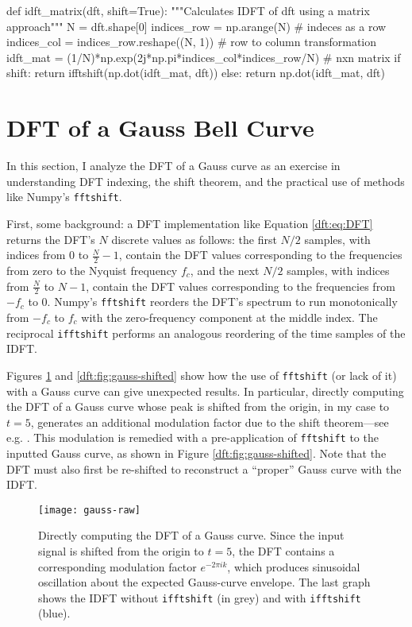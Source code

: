 \documentclass[11pt, a4paper]{article}
\begin{document}
\begin{python}
def idft_matrix(dft, shift=True):
    """Calculates IDFT of dft using a matrix approach"""
    N = dft.shape[0]
    indices_row = np.arange(N)  # indeces as a row
    indices_col = indices_row.reshape((N, 1))  # row to column transformation
    idft_mat = (1/N)*np.exp(2j*np.pi*indices_col*indices_row/N)  # nxn matrix
    if shift: return ifftshift(np.dot(idft_mat, dft))
    else: return np.dot(idft_mat, dft)
\end{python}


\section{DFT of a Gauss Bell Curve}
In this section, I analyze the DFT of a Gauss curve as an exercise in understanding DFT indexing, the shift theorem, and the practical use of methods like Numpy's \texttt{fftshift}.

First, some background: a DFT implementation like Equation \ref{dft:eq:DFT} returns the DFT's $ N $ discrete values as follows: the first $ N/2 $ samples, with indices from $ 0 $ to $ \frac{N}{2}-1 $, contain the DFT values corresponding to the frequencies from zero to the Nyquist frequency $ f_{c} $, and the next $ N/2 $ samples, with indices from $ \frac{N}{2} $ to $ N - 1 $, contain the DFT values corresponding to the frequencies from $ -f_{c} $ to $ 0 $. Numpy's \texttt{fftshift} reorders the DFT's spectrum to run monotonically from $ -f_{c} $ to $ f_{c} $ with the zero-frequency component at the middle index. The reciprocal \texttt{ifftshift} performs an analogous reordering of the time samples of the IDFT.


Figures \ref{dft:fig:gauss-raw} and \ref{dft:fig:gauss-shifted} show how the use of \texttt{fftshift} (or lack of it) with a Gauss curve can give unexpected results. In particular, directly computing the DFT of a Gauss curve whose peak is shifted from the origin, in my case to $ t = 5 $, generates an additional modulation factor due to the shift theorem---see e.g. \cite{wiki-shift}. This modulation is remedied with a pre-application of \texttt{fftshift} to the inputted Gauss curve, as shown in Figure \ref{dft:fig:gauss-shifted}. Note that the DFT must also first be re-shifted to reconstruct a ``proper'' Gauss curve with the IDFT.

\begin{figure}
\centering
\texttt{[image: gauss-raw]}
\caption{Directly computing the DFT of a Gauss curve. Since the input signal is shifted from the origin to $ t = 5 $, the DFT contains a corresponding modulation factor $ e^{-2\pi i k} $, which produces sinusoidal oscillation about the expected Gauss-curve envelope. The last graph shows the IDFT without \texttt{ifftshift} (in grey) and with \texttt{ifftshift} (blue).}
\label{dft:fig:gauss-raw}
\end{figure}
\end{document}
